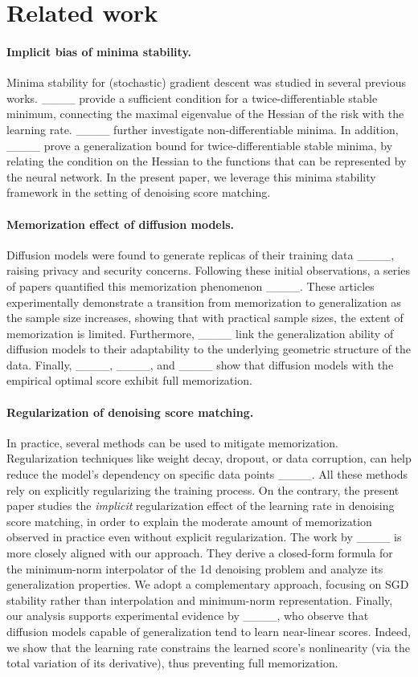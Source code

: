 \section{Related work}
\label{sec:related-work}
\paragraph{Implicit bias of minima stability.} Minima stability for (stochastic) gradient descent was studied in several previous works. ____ provide a sufficient condition for a twice-differentiable stable minimum, connecting the maximal eigenvalue of the Hessian of the risk with the learning rate. ____ further investigate non-differentiable minima. In addition, ____ prove a generalization bound for twice-differentiable stable minima, by relating the condition on the Hessian to the functions that can be represented by the neural network. In the present paper, we leverage this minima stability framework in the setting of denoising score matching.

\paragraph{Memorization effect of diffusion models.} Diffusion models were found to generate replicas of their training data ____, raising privacy and security concerns. Following these initial observations, a series of papers quantified this memorization phenomenon ____. These articles experimentally demonstrate a transition from memorization to generalization as the sample size increases, showing that with practical sample sizes, the extent of memorization is limited. Furthermore, ____ link the generalization ability of diffusion models to their adaptability to the underlying geometric structure of the data. Finally, ____, ____, and ____ show that diffusion models with the empirical optimal score exhibit full memorization.  

\paragraph{Regularization of denoising score matching.}
In practice, several methods can be used to mitigate memorization. 
Regularization techniques like weight decay, dropout, or data corruption, can help reduce the model’s dependency on specific data points ____.  All these methods rely on explicitly regularizing the training process. On the contrary, the present paper studies the \textit{implicit} regularization effect of the learning rate in denoising score matching, in order to explain the moderate amount of memorization observed in practice even without explicit regularization. The work by ____ is more closely aligned with our approach. They derive a closed-form formula for the minimum-norm interpolator of the 1d denoising problem and analyze its generalization properties. We adopt a complementary approach, focusing on SGD stability rather than interpolation and minimum-norm representation. Finally, our analysis supports experimental evidence by ____, who observe that diffusion models capable of generalization tend to learn near-linear scores. Indeed, we show that the learning rate constrains the learned score’s nonlinearity (via the total variation of its derivative), thus preventing full memorization.